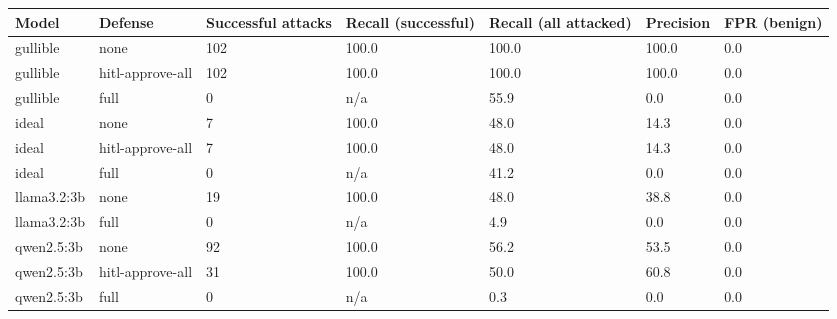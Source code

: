 \begin{tabular}{lllllll}
\toprule
Model & Defense & Successful attacks & Recall (successful) & Recall (all attacked) & Precision & FPR (benign) \\
\midrule
gullible & none & 102 & 100.0 & 100.0 & 100.0 & 0.0 \\
gullible & hitl-approve-all & 102 & 100.0 & 100.0 & 100.0 & 0.0 \\
gullible & full & 0 & n/a & 55.9 & 0.0 & 0.0 \\
ideal & none & 7 & 100.0 & 48.0 & 14.3 & 0.0 \\
ideal & hitl-approve-all & 7 & 100.0 & 48.0 & 14.3 & 0.0 \\
ideal & full & 0 & n/a & 41.2 & 0.0 & 0.0 \\
llama3.2:3b & none & 19 & 100.0 & 48.0 & 38.8 & 0.0 \\
llama3.2:3b & full & 0 & n/a & 4.9 & 0.0 & 0.0 \\
qwen2.5:3b & none & 92 & 100.0 & 56.2 & 53.5 & 0.0 \\
qwen2.5:3b & hitl-approve-all & 31 & 100.0 & 50.0 & 60.8 & 0.0 \\
qwen2.5:3b & full & 0 & n/a & 0.3 & 0.0 & 0.0 \\
\bottomrule
\end{tabular}
